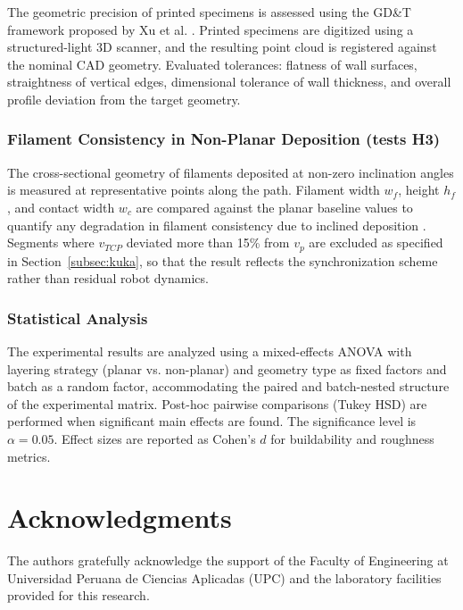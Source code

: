 \documentclass[conference]{IEEEtran}
\begin{document}
The geometric precision of printed specimens is assessed using the GD\&T framework proposed by Xu et al. \cite{xu_inspecting_2020}. Printed specimens are digitized using a structured-light 3D scanner, and the resulting point cloud is registered against the nominal CAD geometry. Evaluated tolerances: flatness of wall surfaces, straightness of vertical edges, dimensional tolerance of wall thickness, and overall profile deviation from the target geometry.

\subsubsection{Filament Consistency in Non-Planar Deposition (tests H3)}

The cross-sectional geometry of filaments deposited at non-zero inclination angles is measured at representative points along the path. Filament width $w_f$, height $h_f$, and contact width $w_c$ are compared against the planar baseline values to quantify any degradation in filament consistency due to inclined deposition \cite{alhussain_developing_2024, wolfs_filament_2021}. Segments where $v_{TCP}$ deviated more than 15\% from $v_p$ are excluded as specified in Section~\ref{subsec:kuka}, so that the result reflects the synchronization scheme rather than residual robot dynamics.

\subsubsection{Statistical Analysis}

The experimental results are analyzed using a mixed-effects ANOVA with layering strategy (planar vs. non-planar) and geometry type as fixed factors and batch as a random factor, accommodating the paired and batch-nested structure of the experimental matrix. Post-hoc pairwise comparisons (Tukey HSD) are performed when significant main effects are found. The significance level is $\alpha = 0.05$. Effect sizes are reported as Cohen's $d$ for buildability and roughness metrics.

\section*{Acknowledgments}
The authors gratefully acknowledge the support of the Faculty of Engineering at Universidad Peruana de Ciencias Aplicadas (UPC) and the laboratory facilities provided for this research.



\end{document}
